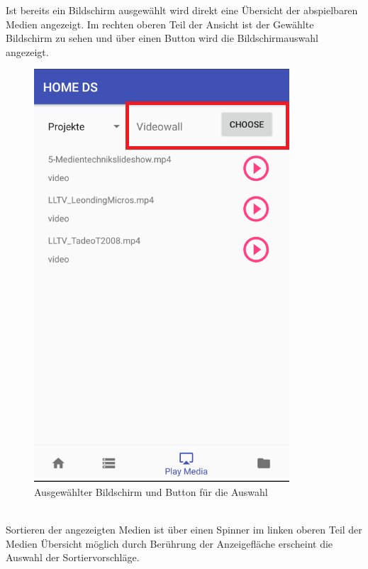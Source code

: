 Ist bereits ein Bildschirm ausgewählt wird direkt eine Übersicht der abspielbaren Medien angezeigt. Im rechten oberen Teil der Ansicht ist der Gewählte Bildschirm zu sehen und über einen Button wird die Bildschirmauswahl angezeigt.
\begin{figure}[H]
\centering
\includegraphics[scale=0.35]{images/06_AndroidApp/06_displayTextAndButton}
\caption{Ausgewählter Bildschirm und Button für die Auswahl}
\label{fig:mediaNav}
\end{figure}
\\
Sortieren der angezeigten Medien ist über einen Spinner im linken oberen Teil der Medien Übersicht möglich durch Berührung der Anzeigefläche erscheint die Auswahl der Sortiervorschläge.

